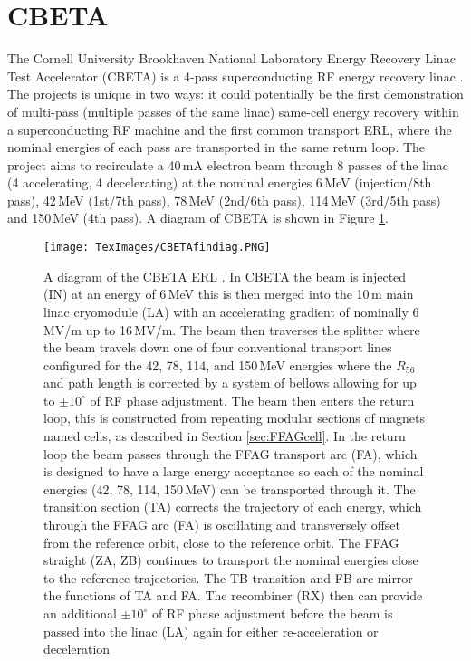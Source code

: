 \documentclass[11pt]{article}
\begin{document}
\section{CBETA}
\label{sec:CBETA}

The Cornell University Brookhaven National Laboratory Energy Recovery Linac Test Accelerator (CBETA) is a 4-pass superconducting RF energy recovery linac \cite{DejanIPAC2017}. The projects is unique in two ways: it could potentially be the first demonstration of multi-pass (multiple passes of the same linac) same-cell energy recovery within a superconducting RF machine and the first common transport ERL, where the nominal energies of each pass are transported in the same return loop. The project aims to recirculate a 40\,mA electron beam \cite{IPAC2018CBETA} through 8 passes of the linac (4 accelerating, 4 decelerating) at the nominal energies 6\,MeV (injection/8th pass), 42\,MeV (1st/7th pass), 78\,MeV (2nd/6th pass), 114\,MeV (3rd/5th pass) and 150\,MeV (4th pass). A diagram of CBETA is shown in Figure \ref{fig:CBETAdiag}.

\begin{figure}[H]
\centering
\texttt{[image: TexImages/CBETAfindiag.PNG]}
\caption{\label{fig:CBETAdiag} A diagram of the CBETA ERL \cite{CBETATDR}. In CBETA the beam is injected (IN) at an energy of 6\,MeV this is then merged into the 10\,m main linac cryomodule (LA) with an accelerating gradient of nominally 6\,MV/m up to 16\,MV/m.  The beam then traverses the splitter where the beam travels down one of four conventional transport lines configured for the 42, 78, 114, and 150\,MeV energies where the $R_{56}$ and path length is corrected by a system of bellows allowing for up to $\pm 10^{\circ}$ of RF phase adjustment. The beam then enters the return loop, this is constructed from repeating modular sections of magnets named cells, as described in Section \ref{sec:FFAGcell}. In the return loop the beam passes through the FFAG transport arc (FA), which is designed to have a large energy acceptance so each of the nominal energies (42, 78, 114, 150\,MeV) can be transported through it. The transition section (TA) corrects the trajectory of each energy, which through the FFAG arc (FA) is oscillating and transversely offset from the reference orbit, close to the reference orbit. The FFAG straight (ZA, ZB) continues to transport the nominal energies close to the reference trajectories. The TB transition and FB arc mirror the functions of TA and FA. The recombiner (RX) then can provide an additional $\pm 10^{\circ}$ of RF phase adjustment before the beam is passed into the linac (LA) again for either re-acceleration or deceleration}          
\end{figure}
\end{document}

